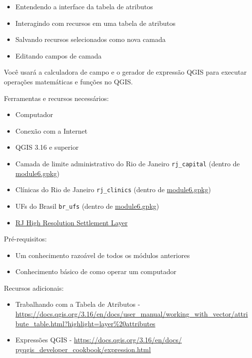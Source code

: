 \documentclass[
]{krantz}
\providecommand{\tightlist}{%
  \setlength{\itemsep}{0pt}\setlength{\parskip}{0pt}}
\begin{document}
\begin{itemize}
\tightlist
\item
  Entendendo a interface da tabela de atributos
\item
  Interagindo com recursos em uma tabela de atributos
\item
  Salvando recursos selecionados como nova camada
\item
  Editando campos de camada
\end{itemize}

Você usará a calculadora de campo e o gerador de expressão QGIS para executar operações matemáticas e funções no QGIS.

Ferramentas e recursos necessários:

\begin{itemize}
\tightlist
\item
  Computador
\item
  Conexão com a Internet
\item
  QGIS 3.16 e superior
\item
  Camada de limite administrativo do Rio de Janeiro \texttt{rj\_capital} (dentro de \href{data/module6/module6.gpkg}{module6.gpkg})
\item
  Clínicas do Rio de Janeiro \texttt{rj\_clinics} (dentro de \href{data/module6/module6.gpkg}{module6.gpkg})
\item
  UFs do Brasil \texttt{br\_ufs} (dentro de \href{data/module6/module6.gpkg}{module6.gpkg})
\item
  \href{data/module6/hrsl_rj_capital_populacao.tif}{RJ High Resolution Settlement Layer}
\end{itemize}

Pré-requisitos:

\begin{itemize}
\tightlist
\item
  Um conhecimento razoável de todos os módulos anteriores
\item
  Conhecimento básico de como operar um computador
\end{itemize}

Recursos adicionais:

\begin{itemize}
\tightlist
\item
  Trabalhando com a Tabela de Atributos - \url{https://docs.qgis.org/3.16/en/docs/user_manual/working_with_vector/attribute_table.html?highlight=layer\%20attributes}
\item
  Expressões QGIS - \href{https://docs.qgis.org/3.16/en/docs/pyqgis_developer_cookbook/expressions.html}{https://docs.qgis.org/3.16/en/docs/ pyqgis\_developer\_cookbook/expression.html}
\end{itemize}
\end{document}
